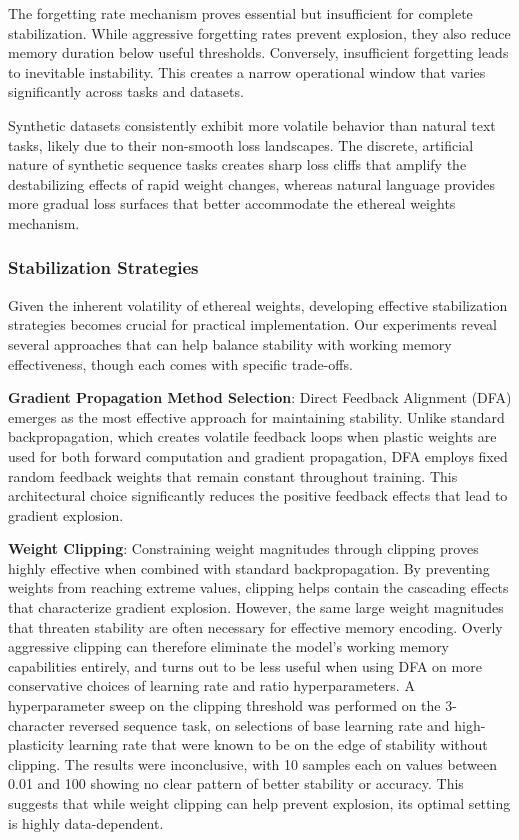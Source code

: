 \documentclass{article} %
\begin{document}
The forgetting rate mechanism proves essential but insufficient for complete stabilization. While aggressive forgetting rates prevent explosion, they also reduce memory duration below useful thresholds. Conversely, insufficient forgetting leads to inevitable instability. This creates a narrow operational window that varies significantly across tasks and datasets.

Synthetic datasets consistently exhibit more volatile behavior than natural text tasks, likely due to their non-smooth loss landscapes. The discrete, artificial nature of synthetic sequence tasks creates sharp loss cliffs that amplify the destabilizing effects of rapid weight changes, whereas natural language provides more gradual loss surfaces that better accommodate the ethereal weights mechanism.

\subsubsection{Stabilization Strategies}

Given the inherent volatility of ethereal weights, developing effective stabilization strategies becomes crucial for practical implementation. Our experiments reveal several approaches that can help balance stability with working memory effectiveness, though each comes with specific trade-offs.

\textbf{Gradient Propagation Method Selection}: Direct Feedback Alignment (DFA) emerges as the most effective approach for maintaining stability. Unlike standard backpropagation, which creates volatile feedback loops when plastic weights are used for both forward computation and gradient propagation, DFA employs fixed random feedback weights that remain constant throughout training. This architectural choice significantly reduces the positive feedback effects that lead to gradient explosion.

\textbf{Weight Clipping}: Constraining weight magnitudes through clipping proves highly effective when combined with standard backpropagation. By preventing weights from reaching extreme values, clipping helps contain the cascading effects that characterize gradient explosion. However, the same large weight magnitudes that threaten stability are often necessary for effective memory encoding. Overly aggressive clipping can therefore eliminate the model's working memory capabilities entirely, and turns out to be less useful when using DFA on more conservative choices of learning rate and ratio hyperparameters.
A hyperparameter sweep on the clipping threshold was performed on the 3-character reversed sequence task, on selections of base learning rate and high-plasticity learning rate that were known to be on the edge of stability without clipping. The results were inconclusive, with 10 samples each on values between 0.01 and 100 showing no clear pattern of better stability or accuracy. This suggests that while weight clipping can help prevent explosion, its optimal setting is highly data-dependent.
\end{document}

